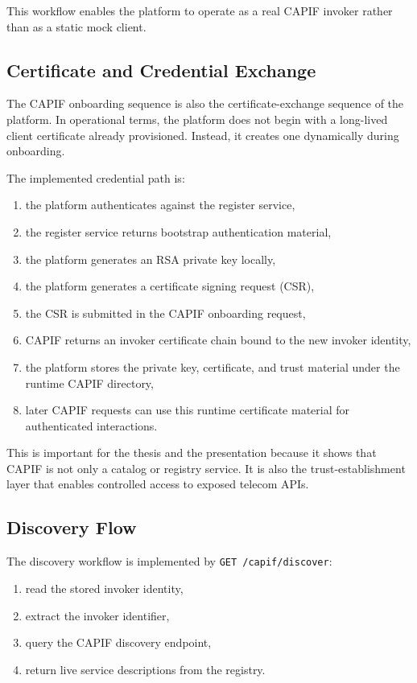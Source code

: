 \documentclass[conference]{IEEEtran}
\begin{document}
This workflow enables the platform to operate as a real CAPIF invoker rather than as a static mock client.

\subsection{Certificate and Credential Exchange}

The CAPIF onboarding sequence is also the certificate-exchange sequence of the platform. In operational terms, the platform does not begin with a long-lived client certificate already provisioned. Instead, it creates one dynamically during onboarding.

The implemented credential path is:

\begin{enumerate}[leftmargin=1.1em]
\item the platform authenticates against the register service,
\item the register service returns bootstrap authentication material,
\item the platform generates an RSA private key locally,
\item the platform generates a certificate signing request (CSR),
\item the CSR is submitted in the CAPIF onboarding request,
\item CAPIF returns an invoker certificate chain bound to the new invoker identity,
\item the platform stores the private key, certificate, and trust material under the runtime CAPIF directory,
\item later CAPIF requests can use this runtime certificate material for authenticated interactions.
\end{enumerate}

This is important for the thesis and the presentation because it shows that CAPIF is not only a catalog or registry service. It is also the trust-establishment layer that enables controlled access to exposed telecom APIs.

\subsection{Discovery Flow}

The discovery workflow is implemented by \texttt{GET /capif/discover}:

\begin{enumerate}[leftmargin=1.1em]
\item read the stored invoker identity,
\item extract the invoker identifier,
\item query the CAPIF discovery endpoint,
\item return live service descriptions from the registry.
\end{enumerate}
\end{document}
